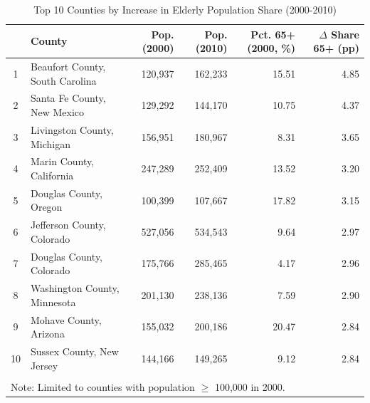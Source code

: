 \begin{table}[htbp]
\caption{Top 10 Counties by Increase in Elderly Population Share (2000-2010)}
\label{tab:top10_elderly_increase}
\begin{tabular}{clrrrr}
\toprule
 & County & Pop. (2000) & Pop. (2010) & Pct. 65+ (2000, \%) & $\Delta$ Share 65+ (pp) \\
\midrule
1 & Beaufort County, South Carolina & 120,937 & 162,233 & 15.51 & 4.85 \\
2 & Santa Fe County, New Mexico & 129,292 & 144,170 & 10.75 & 4.37 \\
3 & Livingston County, Michigan & 156,951 & 180,967 & 8.31 & 3.65 \\
4 & Marin County, California & 247,289 & 252,409 & 13.52 & 3.20 \\
5 & Douglas County, Oregon & 100,399 & 107,667 & 17.82 & 3.15 \\
6 & Jefferson County, Colorado & 527,056 & 534,543 & 9.64 & 2.97 \\
7 & Douglas County, Colorado & 175,766 & 285,465 & 4.17 & 2.96 \\
8 & Washington County, Minnesota & 201,130 & 238,136 & 7.59 & 2.90 \\
9 & Mohave County, Arizona & 155,032 & 200,186 & 20.47 & 2.84 \\
10 & Sussex County, New Jersey & 144,166 & 149,265 & 9.12 & 2.84 \\
\bottomrule
\\
\multicolumn{6}{l}{\footnotesize Note: Limited to counties with population $\geq$ 100,000 in 2000.} \\
\end{tabular}
\end{table}
